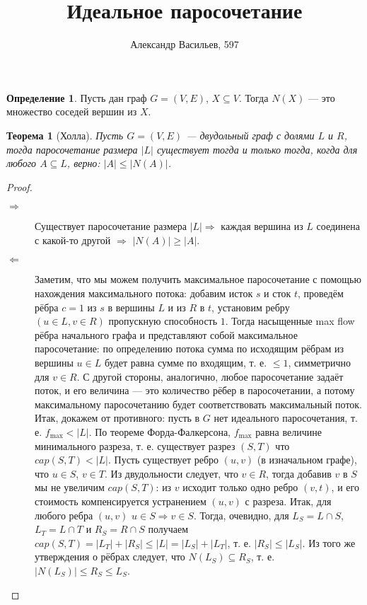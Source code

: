\documentclass[a4paper]{paper}
\title{Идеальное паросочетание}
\author{Александр Васильев, 597}
\theoremstyle{plain}
\newtheorem{theorem}{Теорема}
\theoremstyle{definition}
\newtheorem{definition}{Определение}
\newcommand{\To}{\Rightarrow}
\begin{document}
 
\maketitle
\begin{definition}
Пусть дан граф $G = (V, E)$, $X \subseteq V$.
Тогда $N(X)$ --- это множество соседей вершин из $X$.
\end{definition}
\begin{theorem}[Холла]
Пусть $G = (V, E)$ — двудольный граф с долями $L$ и $R$,
тогда паросочетание размера $|L|$ существует тогда и только тогда,
когда для любого $A \subseteq L$, верно: $|A| \le |N(A)|$.
\end{theorem}
\begin{proof}~
\begin{description}
\item[$\Rightarrow$]
Существует паросочетание размера $|L| \To$ каждая вершина из $L$
соединена с какой-то другой $\To$ $|N(A)| \ge |A|$.
\item[$\Leftarrow$]
Заметим, что мы можем получить максимальное паросочетание с помощью нахождения
максимального потока: добавим исток $s$ и сток $t$, проведём рёбра $c = 1$
из $s$ в вершины $L$ и из $R$ в $t$, установим ребру $(u \in L, v \in R)$
пропускную способность $1$. Тогда насыщенные max flow рёбра
начального графа и представляют собой максимальное паросочетание:
по определению потока сумма по исходящим рёбрам из вершины $u \in L$
будет равна сумме по входящим, т. е. $\le 1$, симметрично для $v \in R$.
С другой стороны, аналогично, любое паросочетание задаёт поток, и его величина ---
это количество рёбер в паросочетании, а потому максимальному паросочетанию будет
соответствовать максимальный поток.
Итак, докажем от противного: пусть в $G$ нет идеального паросочетания, т. е.
$f_{\max} < |L|$. По теореме Форда-Фалкерсона, $f_{\max}$ равна величине
минимального разреза, т. е. существует разрез $(S, T)$ что
$cap(S,T) < |L|$. Пусть существует ребро
$(u, v)$ (в изначальном графе), что $u \in S$, $v \in T$.
Из двудольности следует, что $v \in R$, тогда добавив $v$ в $S$ мы
не увеличим $cap(S,T)$: из $v$ исходит только одно ребро $(v, t)$,
и его стоимость компенсируется устранением $(u, v)$ с разреза.
Итак, для любого ребра $(u, v)$ $u \in S \To v \in S$. Тогда, очевидно,
для $L_S = L \cap S$, $L_T = L \cap T$ и $R_S = R \cap S$ получаем
$cap(S, T) = |L_T| + |R_S| \le |L| = |L_S| + |L_T|$, т. е.
$|R_S| \le |L_S|$. Из того же утверждения о рёбрах следует, что
$N(L_S) \subseteq R_S$, т. е. $|N(L_S)| \le R_S \le L_S$.
\end{description}
\end{proof}
\end{document}
